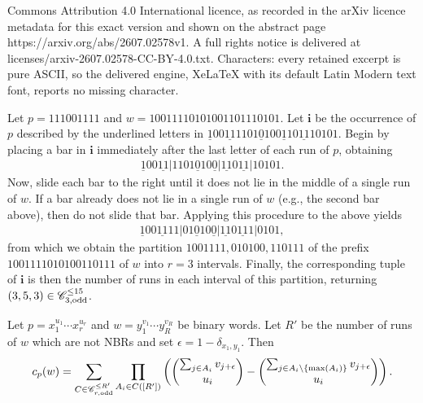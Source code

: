 \documentclass[10pt,a4paper]{amsart}
\begin{document}
Commons Attribution 4.0 International licence, as recorded in the arXiv licence metadata for this exact version and shown on the abstract page https://arxiv.org/abs/2607.02578v1. A full rights notice is delivered at licenses/arxiv-2607.02578-CC-BY-4.0.txt. Characters: every retained excerpt is pure ASCII, so the delivered engine, XeLaTeX with its default Latin Modern text font, reports no missing character.
\begin{ex}\label{inverse_of_algorithm}
    \normalfont Let $p=111001111$ and $w=10011110101001101110101$. Let $\mathbf{i}$ be the occurrence of $p$ described by the underlined letters in $\underline{1}00\underline{11}1101\underline{0}10\underline{011}0\underline{11}10101$. Begin by placing a bar in $\mathbf{i}$ immediately after the last letter of each run of $p$, obtaining
    \begin{align*}
        \underline{1}00\underline{11}\Big|1101\underline{0}10\underline{0}\Big|\underline{11}0\underline{11}\Big|10101.
    \end{align*}
    Now, slide each bar to the right until it does not lie in the middle of a single run of $w$. If a bar already does not lie in a single run of $w$ (e.g., the second bar above), then do not slide that bar. Applying this procedure to the above yields
    \begin{align*}
        \underline{1}00\underline{11}11\Big|01\underline{0}10\underline{0}\Big|\underline{11}0\underline{11}1\Big|0101,
    \end{align*}
    from which we obtain the partition $1001111,010100,110111$ of the prefix $1001111010100110111$ of $w$ into $r=3$ intervals. Finally, the corresponding tuple of $\mathbf{i}$ is then the number of runs in each interval of this partition, returning $(3,5,3)\in \mathscr{C}_{3,\text{\normalfont odd}}^{\leq 15}$. 
\end{ex}

\begin{prop}\label{combinatorial_formula_for_number_of_occurrences}
    Let $p=x_1^{u_1}\cdots x_r^{u_r}$ and $w=y_1^{v_1}\cdots y_{R}^{v_R}$ be binary words. Let $R'$ be the number of runs of $w$ which are not NBRs and set $\epsilon=1-\delta_{x_1,y_1}$. Then
    \begin{align}\label{eqn_comb_formula}
        c_p(w)=\sum_{C\in\mathscr{C}_{r,\text{\normalfont odd}}^{\leq R'}}\prod_{A_i\in C([R'])}\left({\sum_{j\in A_i}v_{j+\epsilon}\choose u_i}-{\sum_{j\in A_i\setminus\{\max(A_i)\}}v_{j+\epsilon}\choose u_i}\right).
    \end{align}
\end{prop}
\end{document}
